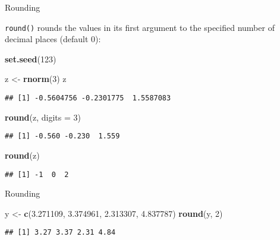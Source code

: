 \documentclass[ignorenonframetext,]{beamer}
\newenvironment{Shaded}{\begin{snugshade}}{\end{snugshade}}
\newcommand{\DataTypeTok}[1]{\textcolor[rgb]{0.13,0.29,0.53}{#1}}
\newcommand{\DecValTok}[1]{\textcolor[rgb]{0.00,0.00,0.81}{#1}}
\newcommand{\FloatTok}[1]{\textcolor[rgb]{0.00,0.00,0.81}{#1}}
\newcommand{\KeywordTok}[1]{\textcolor[rgb]{0.13,0.29,0.53}{\textbf{#1}}}
\newcommand{\NormalTok}[1]{#1}
\newcommand{\StringTok}[1]{\textcolor[rgb]{0.31,0.60,0.02}{#1}}
\begin{document}
\begin{frame}[fragile]{Rounding}
\protect\hypertarget{rounding}{}

\texttt{round()} rounds the values in its first argument to the
specified number of decimal places (default 0):

\begin{Shaded}
\begin{Highlighting}[]
\KeywordTok{set.seed}\NormalTok{(}\DecValTok{123}\NormalTok{)}

\NormalTok{z <-}\StringTok{ }\KeywordTok{rnorm}\NormalTok{(}\DecValTok{3}\NormalTok{)}
\NormalTok{z}
\end{Highlighting}
\end{Shaded}

\begin{verbatim}
## [1] -0.5604756 -0.2301775  1.5587083
\end{verbatim}

\begin{Shaded}
\begin{Highlighting}[]
\KeywordTok{round}\NormalTok{(z, }\DataTypeTok{digits =} \DecValTok{3}\NormalTok{)}
\end{Highlighting}
\end{Shaded}

\begin{verbatim}
## [1] -0.560 -0.230  1.559
\end{verbatim}

\begin{Shaded}
\begin{Highlighting}[]
\KeywordTok{round}\NormalTok{(z)}
\end{Highlighting}
\end{Shaded}

\begin{verbatim}
## [1] -1  0  2
\end{verbatim}

\end{frame}

\begin{frame}[fragile]{Rounding}
\protect\hypertarget{rounding-1}{}

\begin{Shaded}
\begin{Highlighting}[]
\NormalTok{y <-}\StringTok{ }\KeywordTok{c}\NormalTok{(}\FloatTok{3.271109}\NormalTok{, }\FloatTok{3.374961}\NormalTok{, }\FloatTok{2.313307}\NormalTok{, }\FloatTok{4.837787}\NormalTok{)}
\KeywordTok{round}\NormalTok{(y, }\DecValTok{2}\NormalTok{)}
\end{Highlighting}
\end{Shaded}

\begin{verbatim}
## [1] 3.27 3.37 2.31 4.84
\end{verbatim}

\end{frame}
\end{document}
